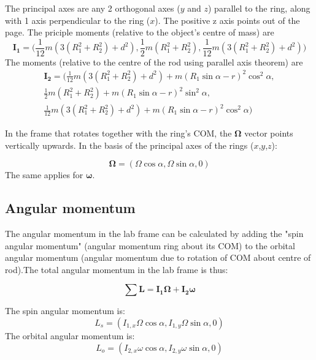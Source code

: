 \documentclass{scrartcl}
\begin{document}
The principal axes are any 2 orthogonal axes ($y$ and $z$) parallel to the ring, along with 1 axis perpendicular to the ring ($x$). The positive z axis points out of the page. The priciple moments (relative to the object's centre of mass) are
\begin{equation}
    \mathbf{I_1}=\Bigg(\frac{1}{12}m(3(R_1^2+R_2^2)+d^2),
    \frac{1}{2}m(R_1^2+R_2^2),
    \frac{1}{12}m(3(R_1^2+R_2^2)+d^2)\Bigg)
\end{equation}
The moments (relative to the centre of the rod using parallel axis theorem) are
\begin{equation}
    \begin{aligned}
        \mathbf{I_2}=\Bigg(\frac{1}{12}m(3(R_1^2+R_2^2)+d^2)+m(R_1\sin\alpha-r)^2 \cos^2\alpha, \\
        \frac{1}{2}m(R_1^2+R_2^2)+m(R_1\sin\alpha-r)^2 \sin^2\alpha,                            \\
        \frac{1}{12}m(3(R_1^2+R_2^2)+d^2)+m(R_1\sin\alpha-r)^2 \cos^2\alpha\Bigg)
    \end{aligned}
\end{equation}

In the frame that rotates together with the ring's COM, the $\mathbf{\Omega}$ vector points vertically upwards. In the basis of the principal axes of the rings ($x$,$y$,$z$):

\begin{equation}
    \mathbf{\Omega}=(\Omega\cos\alpha,\Omega\sin\alpha,0)
\end{equation}
The same applies for $\boldsymbol{\omega}$.

\subsection{Angular momentum}
The angular momentum in the lab frame can be calculated by adding the "spin angular momentum" (angular momentum ring about its COM) to the orbital angular momentum (angular momentum due to rotation of COM about centre of rod).The total angular momentum in the lab frame is thus:

\begin{equation}
    \sum \mathbf{L}=\mathbf{I_1}\boldsymbol{\Omega} + \mathbf{I_2}\boldsymbol{\omega}
\end{equation}

The spin angular momentum is:
\begin{equation}
    L_s= (I_{1,x}\Omega \cos\alpha ,I_{1,y}\Omega \sin\alpha,0)
\end{equation}
The orbital angular momentum is:
\begin{equation}
    L_o= (I_{2,x}\omega \cos\alpha ,I_{2,y}\omega \sin\alpha,0)
\end{equation}
\end{document}
